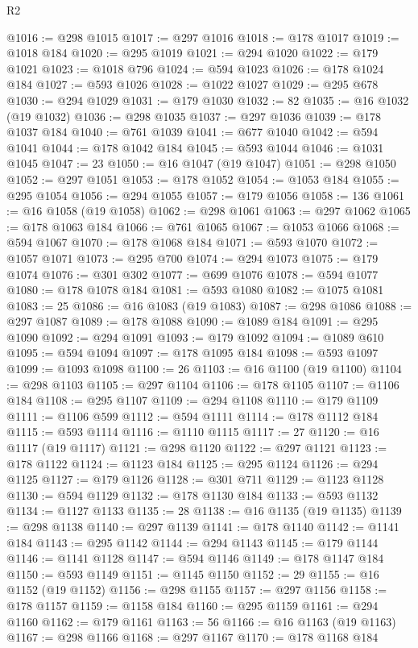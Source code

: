 \begin{lexlean}{R2}
\begin{coremodule}
@1016 := @298 @1015
@1017 := @297 @1016
@1018 := @178 @1017
@1019 := @1018 @184
@1020 := @295 @1019
@1021 := @294 @1020
@1022 := @179 @1021
@1023 := @1018 @796
@1024 := @594 @1023
@1026 := @178 @1024 @184
@1027 := @593 @1026
@1028 := @1022 @1027
@1029 := @295 @678
@1030 := @294 @1029
@1031 := @179 @1030
@1032 := 82
@1035 := @16 @1032 (@19 @1032)
@1036 := @298 @1035
@1037 := @297 @1036
@1039 := @178 @1037 @184
@1040 := @761 @1039
@1041 := @677 @1040
@1042 := @594 @1041
@1044 := @178 @1042 @184
@1045 := @593 @1044
@1046 := @1031 @1045
@1047 := 23
@1050 := @16 @1047 (@19 @1047)
@1051 := @298 @1050
@1052 := @297 @1051
@1053 := @178 @1052
@1054 := @1053 @184
@1055 := @295 @1054
@1056 := @294 @1055
@1057 := @179 @1056
@1058 := 136
@1061 := @16 @1058 (@19 @1058)
@1062 := @298 @1061
@1063 := @297 @1062
@1065 := @178 @1063 @184
@1066 := @761 @1065
@1067 := @1053 @1066
@1068 := @594 @1067
@1070 := @178 @1068 @184
@1071 := @593 @1070
@1072 := @1057 @1071
@1073 := @295 @700
@1074 := @294 @1073
@1075 := @179 @1074
@1076 := @301 @302
@1077 := @699 @1076
@1078 := @594 @1077
@1080 := @178 @1078 @184
@1081 := @593 @1080
@1082 := @1075 @1081
@1083 := 25
@1086 := @16 @1083 (@19 @1083)
@1087 := @298 @1086
@1088 := @297 @1087
@1089 := @178 @1088
@1090 := @1089 @184
@1091 := @295 @1090
@1092 := @294 @1091
@1093 := @179 @1092
@1094 := @1089 @610
@1095 := @594 @1094
@1097 := @178 @1095 @184
@1098 := @593 @1097
@1099 := @1093 @1098
@1100 := 26
@1103 := @16 @1100 (@19 @1100)
@1104 := @298 @1103
@1105 := @297 @1104
@1106 := @178 @1105
@1107 := @1106 @184
@1108 := @295 @1107
@1109 := @294 @1108
@1110 := @179 @1109
@1111 := @1106 @599
@1112 := @594 @1111
@1114 := @178 @1112 @184
@1115 := @593 @1114
@1116 := @1110 @1115
@1117 := 27
@1120 := @16 @1117 (@19 @1117)
@1121 := @298 @1120
@1122 := @297 @1121
@1123 := @178 @1122
@1124 := @1123 @184
@1125 := @295 @1124
@1126 := @294 @1125
@1127 := @179 @1126
@1128 := @301 @711
@1129 := @1123 @1128
@1130 := @594 @1129
@1132 := @178 @1130 @184
@1133 := @593 @1132
@1134 := @1127 @1133
@1135 := 28
@1138 := @16 @1135 (@19 @1135)
@1139 := @298 @1138
@1140 := @297 @1139
@1141 := @178 @1140
@1142 := @1141 @184
@1143 := @295 @1142
@1144 := @294 @1143
@1145 := @179 @1144
@1146 := @1141 @1128
@1147 := @594 @1146
@1149 := @178 @1147 @184
@1150 := @593 @1149
@1151 := @1145 @1150
@1152 := 29
@1155 := @16 @1152 (@19 @1152)
@1156 := @298 @1155
@1157 := @297 @1156
@1158 := @178 @1157
@1159 := @1158 @184
@1160 := @295 @1159
@1161 := @294 @1160
@1162 := @179 @1161
@1163 := 56
@1166 := @16 @1163 (@19 @1163)
@1167 := @298 @1166
@1168 := @297 @1167
@1170 := @178 @1168 @184

\end{coremodule}
\end{lexlean}
